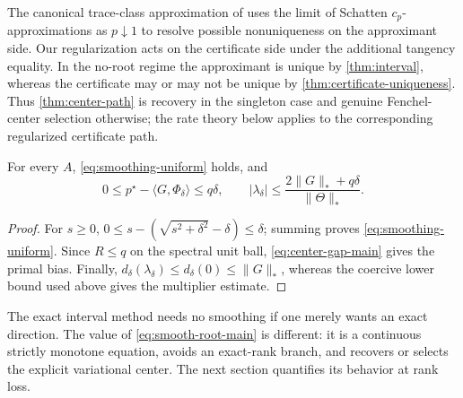\begin{remark}
\label{rem:legg-ward}
The canonical trace-class approximation of \citet{legg1985canonical} uses the
limit of Schatten \(c_p\)-approximations as \(p\downarrow1\) to resolve
possible nonuniqueness on the approximant side.  Our regularization acts on
the certificate side under the additional tangency equality.  In the no-root
regime the approximant is unique by \cref{thm:interval}, whereas the
certificate may or may not be unique by
\cref{thm:certificate-uniqueness}.  Thus \cref{thm:center-path} is recovery in
the singleton case and genuine Fenchel-center selection otherwise; the rate
theory below applies to the corresponding regularized certificate path.
\end{remark}

\begin{corollary}
\label{cor:global-bounds}
For every \(A\), \eqref{eq:smoothing-uniform} holds, and
\begin{equation}
 0\le p^\star-\langle G,\Phi_\delta\rangle\le q\delta,
 \qquad
 |\lambda_\delta|
 \le\frac{2\|G\|_*+q\delta}{\|\Theta\|_*}.
 \label{eq:smooth-lambda-bound}
\end{equation}
\end{corollary}

\begin{proof}
For \(s\ge0\),
\(0\le s-(\sqrt{s^2+\delta^2}-\delta)\le\delta\); summing proves
\eqref{eq:smoothing-uniform}.  Since \(R\le q\) on the spectral unit ball,
\eqref{eq:center-gap-main} gives the primal bias.  Finally,
\(d_\delta(\lambda_\delta)\le d_\delta(0)\le\|G\|_*\), whereas the coercive
lower bound used above gives the multiplier estimate.
\end{proof}

The exact interval method needs no smoothing if one merely wants an exact
direction.  The value of \eqref{eq:smooth-root-main} is different: it is a
continuous strictly monotone equation, avoids an exact-rank branch, and
recovers or selects the explicit variational center.  The next section quantifies its
behavior at rank loss.
